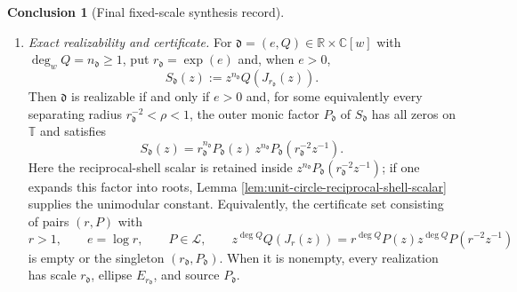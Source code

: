 \documentclass[12pt,a4paper]{article}
\theoremstyle{plain}
\theoremstyle{definition}
\newtheorem{conclusion}[theorem]{Conclusion}
\numberwithin{equation}{section}
\newcommand{\RR}{\mathbb{R}}
\newcommand{\CC}{\mathbb{C}}
\newcommand{\TT}{\mathbb{T}}
\begin{document}
\begin{conclusion}[Final fixed-scale synthesis record]
\begin{enumerate}[label=\textup{(\alph*)},leftmargin=*]
\item \emph{Exact realizability and certificate.}
For \(\mathfrak d=(e,Q)\in\RR\times\CC[w]\) with
\(\deg_wQ=n_{\mathfrak d}\ge1\), put \(r_{\mathfrak d}=\exp(e)\) and,
when \(e>0\),
\[
S_{\mathfrak d}(z):=z^{n_{\mathfrak d}}Q(J_{r_{\mathfrak d}}(z)).
\]
Then \(\mathfrak d\) is realizable if and only if \(e>0\) and, for some
equivalently every separating radius \(r_{\mathfrak d}^{-2}<\rho<1\),
the outer monic factor \(P_{\mathfrak d}\) of \(S_{\mathfrak d}\) has all
zeros on \(\TT\) and satisfies
\[
S_{\mathfrak d}(z)=
r_{\mathfrak d}^{n_{\mathfrak d}}P_{\mathfrak d}(z)\,
z^{n_{\mathfrak d}}P_{\mathfrak d}(r_{\mathfrak d}^{-2}z^{-1}).
\]
Here the reciprocal-shell scalar is retained inside
\(z^{n_{\mathfrak d}}P_{\mathfrak d}(r_{\mathfrak d}^{-2}z^{-1})\); if
one expands this factor into roots, Lemma
\ref{lem:unit-circle-reciprocal-shell-scalar} supplies the unimodular
constant.
Equivalently, the certificate set consisting of pairs \((r,P)\) with
\[
r>1,\qquad e=\log r,\qquad P\in\mathcal L,\qquad
z^{\deg Q}Q(J_r(z))=r^{\deg Q}P(z)z^{\deg Q}P(r^{-2}z^{-1})
\]
is empty or the singleton \((r_{\mathfrak d},P_{\mathfrak d})\).  When it
is nonempty, every realization has scale \(r_{\mathfrak d}\), ellipse
\(E_{r_{\mathfrak d}}\), and source \(P_{\mathfrak d}\).


\end{enumerate}
\end{conclusion}
\end{document}
